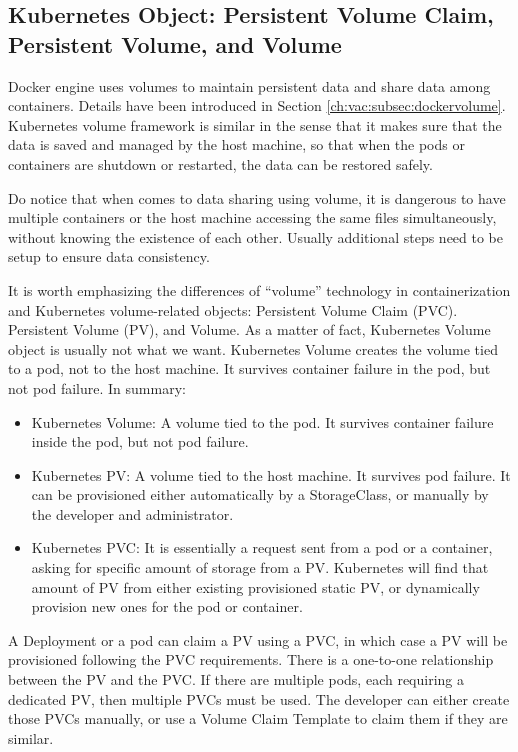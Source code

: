 \subsection{Kubernetes Object: Persistent Volume Claim, Persistent Volume, and Volume} \label{ch:vac:subsec:k8svolume}

Docker engine uses volumes to maintain persistent data and share data among containers. Details have been introduced in Section \ref{ch:vac:subsec:dockervolume}. Kubernetes volume framework is similar in the sense that it makes sure that the data is saved and managed by the host machine, so that when the pods or containers are shutdown or restarted, the data can be restored safely.

Do notice that when comes to data sharing using volume, it is dangerous to have multiple containers or the host machine accessing the same files simultaneously, without knowing the existence of each other. Usually additional steps need to be setup to ensure data consistency.

It is worth emphasizing the differences of ``volume'' technology in containerization and Kubernetes volume-related objects: Persistent Volume Claim (PVC). Persistent Volume (PV), and Volume. As a matter of fact, Kubernetes Volume object is usually not what we want. Kubernetes Volume creates the volume tied to a pod, not to the host machine. It survives container failure in the pod, but not pod failure. In summary:
\begin{itemize}
	\item Kubernetes Volume: A volume tied to the pod. It survives container failure inside the pod, but not pod failure.
	\item Kubernetes PV: A volume tied to the host machine. It survives pod failure. It can be provisioned either automatically by a StorageClass, or manually by the developer and administrator.
	\item Kubernetes PVC: It is essentially a request sent from a pod or a container, asking for specific amount of storage from a PV. Kubernetes will find that amount of PV from either existing provisioned static PV, or dynamically provision new ones for the pod or container.
\end{itemize}
A Deployment or a pod can claim a PV using a PVC, in which case a PV will be provisioned following the PVC requirements. There is a one-to-one relationship between the PV and the PVC. If there are multiple pods, each requiring a dedicated PV, then multiple PVCs must be used. The developer can either create those PVCs manually, or use a Volume Claim Template to claim them if they are similar.

